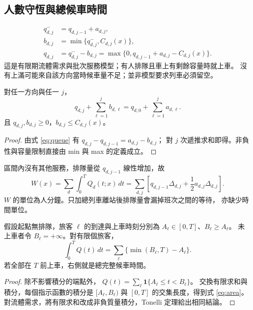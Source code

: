\subsection{人數守恆與總候車時間}
\begin{equation}
\boxed{\begin{aligned}
q^-_{d,j}&=q_{d,j-1}+a_{d,j},\\
b_{d,j}&=\min\{q^-_{d,j},C_{d,j}(x)\},\\
q_{d,j}&=q^-_{d,j}-b_{d,j}
=\max\{0,q_{d,j-1}+a_{d,j}-C_{d,j}(x)\}.
\end{aligned}}
\label{eq:queue}
\end{equation}
這是有限期流體需求與批次服務模型；有人排隊且車上有剩餘容量時就上車。
沒有上滿可能來自該方向當時候車量不足；並非模型要求列車必須留空。

\begin{proposition}[人數守恆]
對任一方向與任一 $j$，
\[
q_{d,j}+\sum_{\ell=1}^j b_{d,\ell}
=q_{d,0}+\sum_{\ell=1}^j a_{d,\ell}.
\]
且 $q_{d,j},b_{d,j}\ge0$，$b_{d,j}\le C_{d,j}(x)$。
\end{proposition}
\begin{proof}
由式 \eqref{eq:queue} 有 $q_{d,j}-q_{d,j-1}=a_{d,j}-b_{d,j}$；
對 $j$ 次遞推求和即得。非負性與容量限制直接由 min 與 max 的定義成立。
\end{proof}

區間內沒有其他服務，排隊量從 $q_{d,j-1}$ 線性增加，故
\begin{equation}
\boxed{W(x)=\sum_d\int_0^T Q_d(t;x)\,dt
=\sum_{d,j}\left[q_{d,j-1}\Delta_{d,j}
+\frac12 a_{d,j}\Delta_{d,j}\right].}
\label{eq:waiting}
\end{equation}
$W$ 的單位為人分鐘。只加總列車離站後排隊量會漏掉班次之間的等待，
亦缺少時間單位。

\begin{theorem}[候車面積的樣本路徑恆等式]
假設起點無排隊，旅客 $\ell$ 的到達與上車時刻分別為
$A_\ell\in[0,T]$、$B_\ell\ge A_\ell$。
未上車者令 $B_\ell=+\infty$。對有限個旅客，
\begin{equation}
\int_0^T Q(t)\,dt
=\sum_\ell\{\min(B_\ell,T)-A_\ell\}.
\label{eq:area}
\end{equation}
若全部在 $T$ 前上車，右側就是總完整候車時間。
\end{theorem}
\begin{proof}
除不影響積分的端點外，
$Q(t)=\sum_\ell\mathbf1\{A_\ell\le t<B_\ell\}$。
交換有限求和與積分，每個指示函數的積分是
$[A_\ell,B_\ell)$ 與 $[0,T]$ 的交集長度，得到式 \eqref{eq:area}。
對流體需求，將有限求和改成非負質量積分，Tonelli 定理給出相同結論。
\end{proof}

